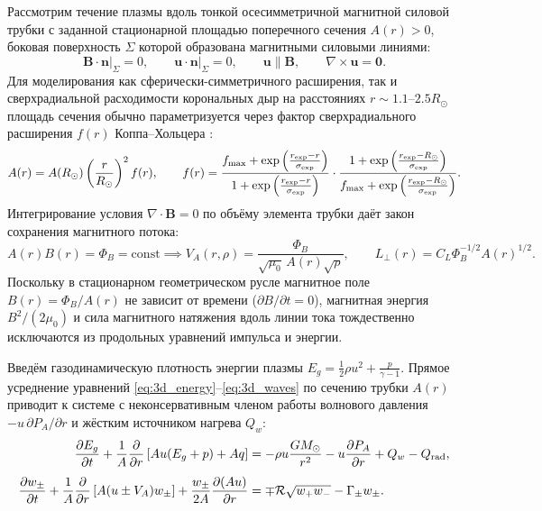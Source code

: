 \documentclass[11pt,a4paper]{article}
\begin{document}
Рассмотрим течение плазмы вдоль тонкой осесимметричной магнитной силовой трубки с заданной стационарной площадью поперечного сечения $A(r) > 0$, боковая поверхность $\Sigma$ которой образована магнитными силовыми линиями:
\[
\left.\bm{B}\cdot\bm{n}\right|_\Sigma = 0, \qquad \left.\bm{u}\cdot\bm{n}\right|_\Sigma = 0, \qquad \bm{u} \parallel \bm{B}, \qquad \nabla\times\bm{u} = \bm{0}.
\]
Для моделирования как сферически-симметричного расширения, так и сверхрадиальной расходимости корональных дыр на расстояниях $r \sim 1.1\text{--}2.5 R_\odot$ площадь сечения обычно параметризуется через фактор сверхрадиального расширения $f(r)$ Коппа--Хольцера \cite{KoppHolzer1976}:
\begin{equation}
A(r) = A(R_\odot)\left(\frac{r}{R_\odot}\right)^2 f(r), \qquad
f(r) = \frac{f_{\max} + \exp\left(\frac{r_{\rm exp} - r}{\sigma_{\rm exp}}\right)}{1 + \exp\left(\frac{r_{\rm exp} - r}{\sigma_{\rm exp}}\right)}\cdot\frac{1 + \exp\left(\frac{r_{\rm exp} - R_\odot}{\sigma_{\rm exp}}\right)}{f_{\max} + \exp\left(\frac{r_{\rm exp} - R_\odot}{\sigma_{\rm exp}}\right)}.
\label{eq:kopp_holzer}
\end{equation}
Интегрирование условия $\nabla\cdot\bm{B} = 0$ по объёму элемента трубки даёт закон сохранения магнитного потока:
\begin{equation}
A(r)B(r) = \Phi_B = \mathrm{const} \implies V_A(r,\rho) = \frac{\Phi_B}{\sqrt{\mu_0}\,A(r)\sqrt{\rho}}, \qquad L_\perp(r) = C_L\Phi_B^{-1/2}A(r)^{1/2}.
\label{eq:flux_tube}
\end{equation}
Поскольку в стационарном геометрическом русле магнитное поле $B(r) = \Phi_B/A(r)$ не зависит от времени ($\partial B/\partial t = 0$), магнитная энергия $B^2/(2\mu_0)$ и сила магнитного натяжения вдоль линии тока тождественно исключаются из продольных уравнений импульса и энергии.

Введём газодинамическую плотность энергии плазмы $E_g = \frac{1}{2}\rho u^2 + \frac{p}{\gamma-1}$. Прямое усреднение уравнений \eqref{eq:3d_energy}--\eqref{eq:3d_waves} по сечению трубки $A(r)$ приводит к системе с неконсервативным членом работы волнового давления $-u\,\partial P_A/\partial r$ и жёстким источником нагрева $Q_w$:
\begin{align}
\frac{\partial E_g}{\partial t} + \frac{1}{A}\frac{\partial}{\partial r}\left[A u (E_g + p) + A q\right] &= -\rho u \frac{GM_\odot}{r^2} - u\frac{\partial P_A}{\partial r} + Q_w - Q_{\rm rad},
\label{eq:noncons_Eg}\\[4pt]
\frac{\partial w_\pm}{\partial t} + \frac{1}{A}\frac{\partial}{\partial r}\left[A(u \pm V_A)w_\pm\right] + \frac{w_\pm}{2A}\frac{\partial(Au)}{\partial r} &= \mp\mathcal{R}\sqrt{w_+ w_-} - \Gamma_\pm w_\pm.
\label{eq:noncons_w}
\end{align}
\end{document}
